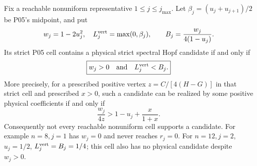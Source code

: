 \begin{proposition}
\label{prop:P11-realizability}
Fix a reachable nonuniform representative $1\le j\le j_{\max}$.
Let $\beta_j=(u_j+u_{j+1})/2$ be P05's midpoint, and put
\begin{equation}
 w_j=1-2u_j^2,\quad L_j^{\rm vert}=\max(0,\beta_j),\qquad
 B_j=\frac{w_j}{4(1-u_j)}.
 \label{eq:P11-realizability-data}
\end{equation}
Its strict P05 cell contains a physical strict spectral Hopf candidate
if and only if
\begin{equation}
 \boxed{w_j>0\quad\hbox{and}\quad L_j^{\rm vert}<B_j.}
 \label{eq:P11-realizability-test}
\end{equation}
More precisely, for a prescribed positive vertex
$z=C/[4(H-G)]$ in that strict cell and prescribed $x>0$, such a
candidate can be realized by some positive physical coefficients if
and only if
\begin{equation}
 \frac{w_j}{4z}>1-u_j+\frac{x}{1+x}.
 \label{eq:P11-fixed-vertex}
\end{equation}
Consequently not every reachable nonuniform cell supports a candidate.
For example $n=8,j=1$ has $w_j=0$ and never reaches $r_j=0$.
For $n=12,j=2$, $u_j=1/2$, $L_j^{\rm vert}=B_j=1/4$;
this cell also has no physical candidate despite $w_j>0$.
\end{proposition}
